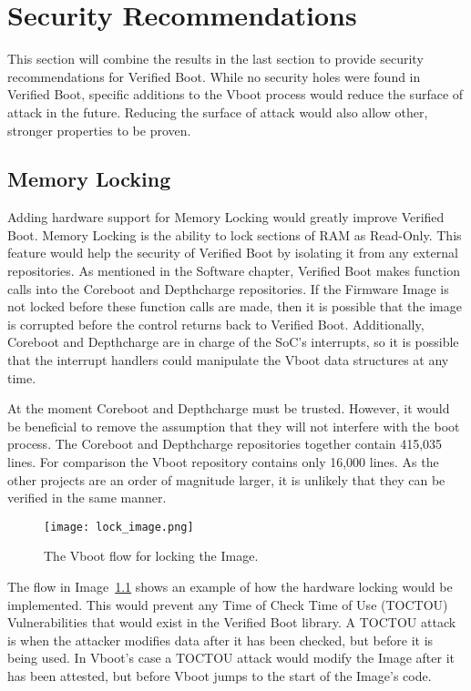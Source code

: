 \chapter{Security Recommendations}

This section will combine the results in the last section to provide security
recommendations for Verified Boot.
While no security holes were found in Verified Boot, specific additions to the
Vboot process would reduce the surface of attack in the future.
Reducing the surface of attack would also allow other, stronger properties to be
proven.

\section{Memory Locking}

Adding hardware support for Memory Locking would greatly improve Verified Boot.
Memory Locking is the ability to lock sections of RAM as Read-Only.
This feature would help the security of Verified Boot by isolating it from
any external repositories.
As mentioned in the Software chapter, Verified Boot makes function calls into
the Coreboot and Depthcharge repositories.
If the Firmware Image is not locked before these function calls are made, then
it is possible that the image is corrupted before the control returns back to
Verified Boot.
Additionally, Coreboot and Depthcharge are in charge of the SoC's interrupts,
so it is possible that the interrupt handlers could manipulate the Vboot data
structures at any time.

At the moment Coreboot and Depthcharge must be trusted.
However, it would be beneficial to remove the assumption that they will not
interfere with the boot process.
The Coreboot and Depthcharge repositories together contain 415,035 lines. 
For comparison the Vboot repository contains only 16,000 lines. 
As the other projects are an order of magnitude larger, it is unlikely that they
can be verified in the same manner.



\begin{figure}
  \centering
  \texttt{[image: lock\_image.png]}
  \caption[Verified Boot Program Flow with Locking]{The Vboot flow for locking the
      Image.
  }\label{fig:lock_flow}
\end{figure}

The flow in Image~\ref{fig:lock_flow} shows an example of how the hardware locking 
would be implemented.
This would prevent any Time of Check Time of Use (TOCTOU) Vulnerabilities that
would exist in the Verified Boot library.
A TOCTOU attack is when the attacker modifies data after it has been checked,
but before it is being used.
In Vboot's case a TOCTOU attack would modify the Image after it has been
attested, but before Vboot jumps to the start of the Image's code.

